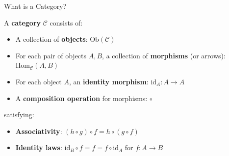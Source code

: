 \documentclass{beamer}
\begin{document}
\begin{frame}{What is a Category?}
    \begin{definition}
        A \textbf{category} $\mathcal{C}$ consists of:
        \begin{itemize}
            \item A collection of \textbf{objects}: $\text{Ob}(\mathcal{C})$
            \item For each pair of objects $A, B$, a collection of \textbf{morphisms} (or arrows): $\text{Hom}_{\mathcal{C}}(A, B)$
            \item For each object $A$, an \textbf{identity morphism}: $\text{id}_A : A \to A$
            \item A \textbf{composition operation} for morphisms: $\circ$
        \end{itemize}
        satisfying:
        \begin{itemize}
            \item \textbf{Associativity}: $(h \circ g) \circ f = h \circ (g \circ f)$
            \item \textbf{Identity laws}: $\text{id}_B \circ f = f = f \circ \text{id}_A$ for $f: A \to B$
        \end{itemize}
    \end{definition}
\end{frame}
\end{document}
